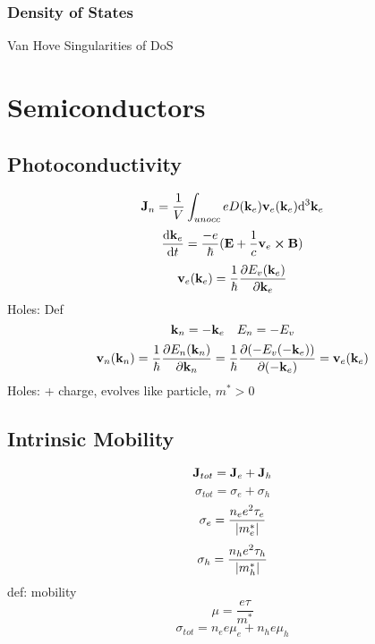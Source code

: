 \documentclass[UTF8]{ctexart} %
\numberwithin{equation}{section}
\begin{document}
\subsubsection{Density of States}
Van Hove Singularities of DoS

\section{Semiconductors}

\subsection{Photoconductivity}
\begin{equation}\label{key}
\vb{J}_n = \dfrac{1}{V}\int_{unocc} e D(\vb{k}_e) \vb{v}_e(\vb{k}_e)\dd[3]\vb{k}_e
\end{equation}
\begin{equation}\label{key}
\dv{\vb{k}_e}{t} = \dfrac{-e}{\hbar}(\vb{E} + \dfrac{1}{c}\vb{v}_e \cross\vb{B})
\end{equation}
\begin{equation}\label{key}
\vb{v}_e(\vb{k}_e) = \dfrac{1}{\hbar}\pdv{E_v(\vb{k}_e)}{\vb{k}_e}
\end{equation}
Holes: Def 
\begin{equation}\label{key}
\vb{k}_n = -\vb{k}_e \quad E_n = -E_v
\end{equation}
\begin{equation}\label{key}
\vb{v}_n(\vb{k}_n) = \dfrac{1}{\hbar}\pdv{E_n(\vb{k}_n)}{\vb{k}_n} = \dfrac{1}{\hbar}\pdv{(-E_v(-\vb{k}_e))}{(-\vb{k}_e)} = \vb{v}_e(\vb{k}_e)
\end{equation}
Holes: + charge, evolves like particle, $ m^\ast > 0 $

\subsection{Intrinsic Mobility}
\begin{equation}\label{key}
\vb{J}_{tot} = \vb{J}_e + \vb{J}_h
\end{equation}
\begin{equation}\label{key}
\sigma_{tot} = \sigma_e + \sigma_h
\end{equation}
\begin{equation}\label{key}
\sigma_e = \dfrac{n_e e^2 \tau_e}{\abs{m_e^\ast}}
\end{equation}
\begin{equation}\label{key}
\sigma_h = \dfrac{n_h e^2 \tau_h}{\abs{m_h^\ast}}
\end{equation}
def: mobility
\begin{equation}\label{key}
\mu = \dfrac{e\tau}{m^\ast}
\end{equation}
\begin{equation}\label{key}
\sigma_{tot} = n_e e \mu_e + n_h e \mu_h
\end{equation}
\end{document}
